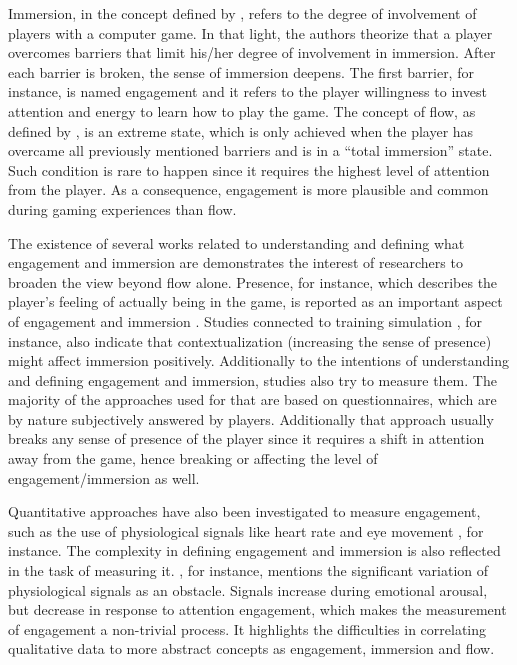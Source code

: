 Immersion, in the concept defined by \textcite{brown2004grounded}, refers to the degree of involvement of players with a computer game. In that light, the authors theorize that a player overcomes barriers that limit his/her degree of involvement in immersion. After each barrier is broken, the sense of immersion deepens. The first barrier, for instance, is named engagement and it refers to the player willingness to invest attention and energy to learn how to play the game. The concept of flow, as defined by \textcite{csikszentmihalyi1991flow}, is an extreme state, which is only achieved when the player has overcame all previously mentioned barriers and is in a ``total immersion'' state. Such condition is rare to happen since it requires the highest level of attention from the player. As a consequence, engagement is more plausible and common during gaming experiences than flow.

The existence of several works \parencite{boyle2012engagement} related to understanding and defining what engagement and immersion are demonstrates the interest of researchers to broaden the view beyond flow alone. Presence, for instance, which describes the player's feeling of actually being in the game, is reported as an important aspect of engagement and immersion \parencite{weibel2011immersion}. Studies connected to training simulation \parencite{engstrom2016impact}, for instance, also indicate that contextualization (increasing the sense of presence) might affect immersion positively. Additionally to the intentions of understanding and defining engagement and immersion, studies also try to measure them. The majority of the approaches used for that are based on questionnaires, which are by nature subjectively answered by players. Additionally that approach usually breaks any sense of presence of the player since it requires a shift in attention away from the game, hence breaking or affecting the level of engagement/immersion as well.

Quantitative approaches have also been investigated to measure engagement, such as the use of physiological signals like heart rate \parencite{ravaja20051} and eye movement \parencite{jennett2008measuring}, for instance. The complexity in defining engagement and immersion is also reflected in the task of measuring it. \textcite{ravaja20051}, for instance, mentions the significant variation of physiological signals as an obstacle. Signals increase during emotional arousal, but decrease in response to attention engagement, which makes the measurement of engagement a non-trivial process. It highlights the difficulties in correlating qualitative data to more abstract concepts as engagement, immersion and flow.

